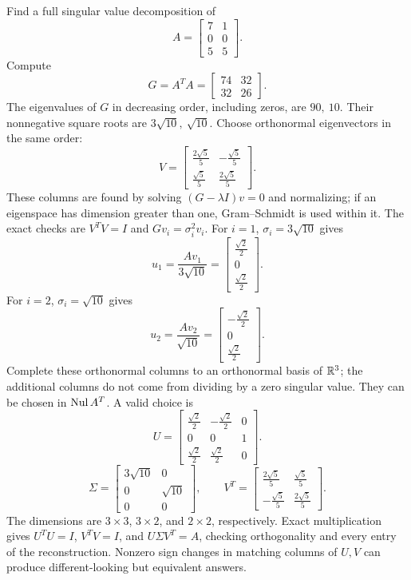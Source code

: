 \goal Find a full singular value decomposition of
\[A=\begin{bmatrix}7&1\\0&0\\5&5\end{bmatrix}.\]
Compute
\[G=A^TA=\begin{bmatrix}74&32\\32&26\end{bmatrix}.\]
The eigenvalues of $G$ in decreasing order, including zeros, are $90,\ 10$. Their nonnegative square roots are $3 \sqrt{10},\ \sqrt{10}$. Choose orthonormal eigenvectors in the same order:
\[V=\begin{bmatrix}\frac{2 \sqrt{5}}{5}&- \frac{\sqrt{5}}{5}\\\frac{\sqrt{5}}{5}&\frac{2 \sqrt{5}}{5}\end{bmatrix}.\]
These columns are found by solving $(G-\lambda I)v=0$ and normalizing; if an eigenspace has dimension greater than one, Gram--Schmidt is used within it. The exact checks are $V^TV=I$ and $Gv_i=\sigma_i^2v_i$.
For $i=1$, $\sigma_i=3 \sqrt{10}$ gives
\[u_{1}=\frac{Av_{1}}{3 \sqrt{10}}=\begin{bmatrix}\frac{\sqrt{2}}{2}\\0\\\frac{\sqrt{2}}{2}\end{bmatrix}.\]
For $i=2$, $\sigma_i=\sqrt{10}$ gives
\[u_{2}=\frac{Av_{2}}{\sqrt{10}}=\begin{bmatrix}- \frac{\sqrt{2}}{2}\\0\\\frac{\sqrt{2}}{2}\end{bmatrix}.\]
Complete these orthonormal columns to an orthonormal basis of $\mathbb{R}^{3}$; the additional columns do not come from dividing by a zero singular value. They can be chosen in $\operatorname{Nul} A^T$.
A valid choice is
\[U=\begin{bmatrix}\frac{\sqrt{2}}{2}&- \frac{\sqrt{2}}{2}&0\\0&0&1\\\frac{\sqrt{2}}{2}&\frac{\sqrt{2}}{2}&0\end{bmatrix}.\]
\[\Sigma=\begin{bmatrix}3 \sqrt{10}&0\\0&\sqrt{10}\\0&0\end{bmatrix},\qquad V^T=\begin{bmatrix}\frac{2 \sqrt{5}}{5}&\frac{\sqrt{5}}{5}\\- \frac{\sqrt{5}}{5}&\frac{2 \sqrt{5}}{5}\end{bmatrix}.\]
The dimensions are $3\times3$, $3\times2$, and $2\times2$, respectively. Exact multiplication gives $U^TU=I$, $V^TV=I$, and $U\Sigma V^T=A$, checking orthogonality and every entry of the reconstruction. Nonzero sign changes in matching columns of $U,V$ can produce different-looking but equivalent answers.



